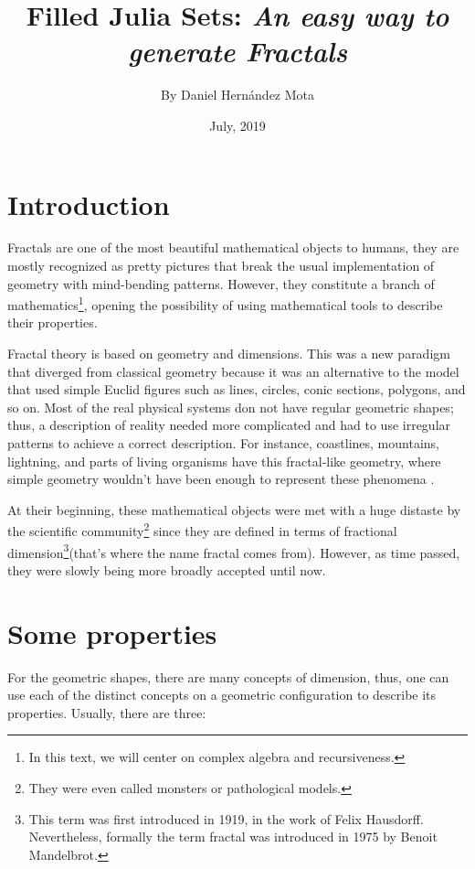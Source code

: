 \documentclass{article}
\title{Filled Julia Sets: \textit{An easy way to generate Fractals}}
\author{By Daniel Hernández Mota}
\date{July, 2019}
\begin{document}
\maketitle

\section{Introduction}

Fractals are one of the most beautiful mathematical objects to humans, they are mostly recognized as pretty pictures that break the usual implementation of geometry with mind-bending patterns. However, they constitute a branch of mathematics\footnote{In this text, we will center on complex algebra and recursiveness.}, opening the possibility of using mathematical tools to describe their properties\cite{Edyta}. 

Fractal theory is based on geometry and dimensions. This was a new paradigm that diverged from classical geometry because it was an alternative to the model that used simple Euclid figures such as lines, circles, conic sections, polygons, and so on. Most of the real physical systems don not have regular geometric shapes; thus, a description of reality needed more complicated and had to use irregular patterns to achieve a correct description\cite{Crownover}. For instance, coastlines, mountains, lightning, and parts of living organisms have this fractal-like geometry, where simple geometry wouldn't have been enough to represent these phenomena \cite{Edyta}.

At their beginning, these mathematical objects were met with a huge distaste by the scientific community\footnote{They were even called monsters or pathological models.} since they are defined in terms of fractional dimension\footnote{This term was first introduced in 1919, in the work of Felix Hausdorff. Nevertheless, formally the term fractal was introduced in 1975 by Benoit Mandelbrot.}(that's where the name fractal comes from). However, as time passed, they were slowly being more broadly accepted until now. 
\newpage
\section{Some properties}
For the geometric shapes, there are many concepts of dimension, thus, one can use each of the distinct concepts on a geometric configuration to describe its properties. Usually, there are three\cite{Crownover}:
\end{document}
